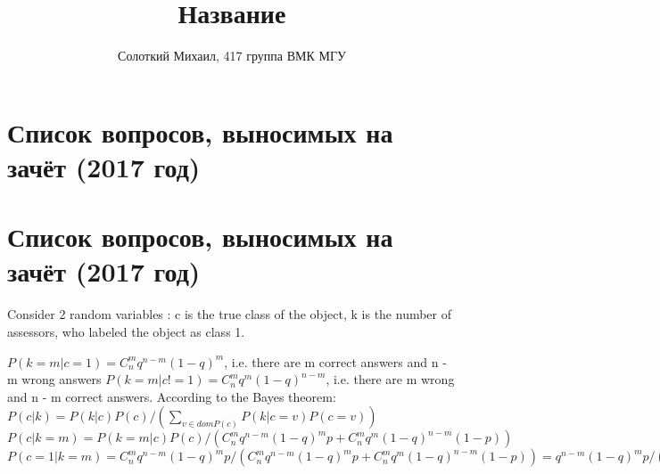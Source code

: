 \documentclass[10pt]{extarticle}
\title{Название}
\author{Солоткий Михаил, 417 группа ВМК МГУ}
\begin{document}
\maketitle
    \section*{Список вопросов, выносимых на зачёт (2017 год)}
    \section{Список вопросов, выносимых на зачёт (2017 год)}

    \cite{paper}

    
    

    Consider 2 random variables : c is the true class of the object, k is the number of assessors, who labeled the object as class 1.

    $P(k = m | c = 1) = C_n^m  q^{n - m}  (1 - q)^{m}$, i.e. there are m correct answers and n - m wrong answers
    $P(k = m | c != 1) = C_n^m  q^{m}  (1 - q)^{n - m}$, i.e. there are m wrong and n - m correct answers.
    According to the Bayes theorem: $P(c | k) = P(k | c) P(c)  /  ( \sum_{v \in dom P(c)}  P(k | c = v) P(c = v) )$
    $P(c | k = m) = P(k = m | c) P(c)  /  (C_n^m  q^{n - m}  (1 - q)^{m}  p +  C_n^m  q^{m}  (1 - q)^{n - m}  (1 - p) )$
    $P(c = 1 | k = m) = C_n^m  q^{n - m}  (1 - q)^{m}  p  /  (C_n^m  q^{n - m}  (1 - q)^{m}  p +  C_n^m  q^{m}  (1 - q)^{n - m}  (1 - p) ) = q^{n - m}  (1 - q)^{m} p  /  ( q^{n - m}  (1 - q)^{m} p  +  q^{m}  (1 - q)^{n - m}) (1 - p) )$
\end{document}
